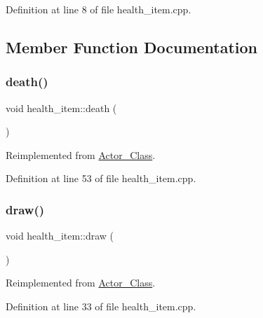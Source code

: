 Definition at line 8 of file health\+\_\+item.\+cpp.



\subsection{Member Function Documentation}
\hypertarget{classhealth__item_a9835f457ffbd1a9e157eac9423ae1201}{}\label{classhealth__item_a9835f457ffbd1a9e157eac9423ae1201} 
\subsubsection{\texorpdfstring{death()}{death()}}
{\footnotesize\ttfamily void health\+\_\+item\+::death (\begin{DoxyParamCaption}{ }\end{DoxyParamCaption})\hspace{0.3cm}{\ttfamily [virtual]}}



Reimplemented from \hyperlink{class_actor___class_a9447c6154a674d7e6bdf24ff2874b7a8}{Actor\+\_\+\+Class}.



Definition at line 53 of file health\+\_\+item.\+cpp.

\hypertarget{classhealth__item_aa9b9410c9e524d807327e682e11d1482}{}\label{classhealth__item_aa9b9410c9e524d807327e682e11d1482} 
\subsubsection{\texorpdfstring{draw()}{draw()}}
{\footnotesize\ttfamily void health\+\_\+item\+::draw (\begin{DoxyParamCaption}{ }\end{DoxyParamCaption})\hspace{0.3cm}{\ttfamily [virtual]}}



Reimplemented from \hyperlink{class_actor___class_ac49cd62be76b4b950ecbe155413f1b64}{Actor\+\_\+\+Class}.



Definition at line 33 of file health\+\_\+item.\+cpp.

\hypertarget{classhealth__item_a97005bdbe125d68fb6cd5561081674e2}{}\label{classhealth__item_a97005bdbe125d68fb6cd5561081674e2} 
